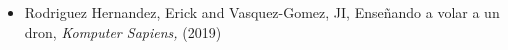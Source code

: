\begin{itemize} 
\item Rodriguez Hernandez, Erick and Vasquez-Gomez, JI, Enseñando a volar a un dron,\textit{ Komputer Sapiens,} (2019)
\end{itemize} 
